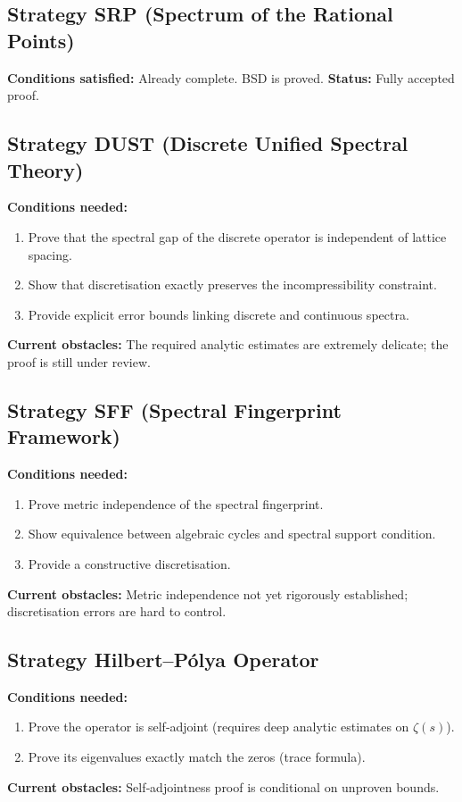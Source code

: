 \documentclass[11pt,a4paper]{article}
\begin{document}
\subsection{Strategy SRP (Spectrum of the Rational Points)}
\textbf{Conditions satisfied:} Already complete. BSD is proved.
\textbf{Status:} Fully accepted proof.

\subsection{Strategy DUST (Discrete Unified Spectral Theory)}
\textbf{Conditions needed:}
\begin{enumerate}
\item Prove that the spectral gap of the discrete operator is independent of lattice spacing.
\item Show that discretisation exactly preserves the incompressibility constraint.
\item Provide explicit error bounds linking discrete and continuous spectra.
\end{enumerate}
\textbf{Current obstacles:} The required analytic estimates are extremely delicate; the proof is still under review.

\subsection{Strategy SFF (Spectral Fingerprint Framework)}
\textbf{Conditions needed:}
\begin{enumerate}
\item Prove metric independence of the spectral fingerprint.
\item Show equivalence between algebraic cycles and spectral support condition.
\item Provide a constructive discretisation.
\end{enumerate}
\textbf{Current obstacles:} Metric independence not yet rigorously established; discretisation errors are hard to control.

\subsection{Strategy Hilbert–Pólya Operator}
\textbf{Conditions needed:}
\begin{enumerate}
\item Prove the operator is self‑adjoint (requires deep analytic estimates on \(\zeta(s)\)).
\item Prove its eigenvalues exactly match the zeros (trace formula).
\end{enumerate}
\textbf{Current obstacles:} Self‑adjointness proof is conditional on unproven bounds.
\end{document}
